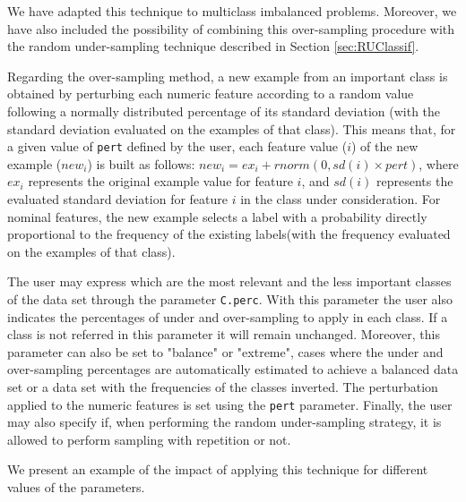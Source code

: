 \documentclass[10pt,a4paper]{article}\usepackage[]{graphicx}\usepackage[]{color}
\begin{document}
We have adapted this technique to multiclass imbalanced problems. Moreover, we have also included the possibility of combining this over-sampling procedure with the random under-sampling technique described in Section \ref{sec:RUClassif}. 

Regarding the over-sampling method, a new example from an important class is obtained by perturbing each numeric feature according to a random value following a normally distributed percentage of its standard deviation (with the standard deviation evaluated on the examples of that class). This means that, for a given value of \texttt{pert} defined by the user, each feature value ($i$) of the new example ($new_i$) is built as follows: $new_i=ex_i+rnorm(0,sd(i)\times pert) $, where $ex_i$ represents the original example value for feature $i$, and $sd(i)$ represents the evaluated standard deviation for feature $i$ in the class under consideration. For nominal features, the new example selects a label with a probability directly proportional to the frequency of the existing labels(with the frequency evaluated on the examples of that class).

The user may express which are the most relevant and the less important classes of the data set through the parameter \texttt{C.perc}. With this parameter the user also indicates the percentages of under and over-sampling to apply in each class. If a class is not referred in this parameter it will remain unchanged. Moreover, this parameter can also be set to "balance" or "extreme", cases where the under and over-sampling percentages are automatically estimated to achieve a balanced data set or a data set with the frequencies of the classes inverted. The perturbation applied to the numeric features is set using the \texttt{pert} parameter. Finally, the user may also specify if, when performing the random under-sampling strategy, it is allowed to perform sampling with repetition or not.

We present an example of the impact of applying this technique for different values of the parameters.
\end{document}
